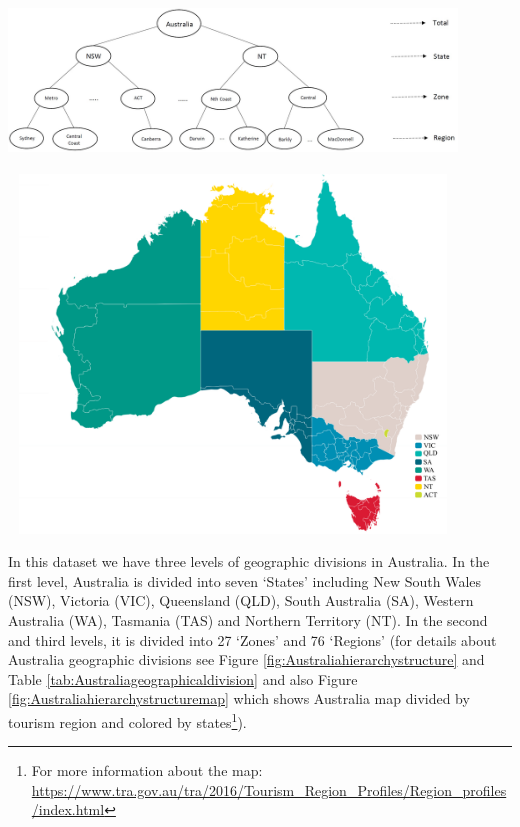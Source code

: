 \documentclass[11pt,a4paper,]{article}
\let\origfigure\figure
\let\endorigfigure\endfigure
\renewenvironment{figure}[1][2] {
    \expandafter\origfigure\expandafter[!htbp]
} {
    \endorigfigure
}
\begin{document}
\begin{figure}

{\centering \includegraphics[width=450px,height=150px]{Paper-Figures/Australian_hierarchy_structure} 

}

\caption{Australian geographic hierarchical structure.}\label{fig:Australiahierarchystructure}
\end{figure}

\begin{figure}

{\centering \includegraphics[width=450px,height=360px]{Paper-Figures/ausTurRegions} 

}

\caption{Australia tourism region map - colors represent states.}\label{fig:Australiahierarchystructuremap}
\end{figure}

\newpage

In this dataset we have three levels of geographic divisions in
Australia. In the first level, Australia is divided into seven `States'
including New South Wales (NSW), Victoria (VIC), Queensland (QLD), South
Australia (SA), Western Australia (WA), Tasmania (TAS) and Northern
Territory (NT). In the second and third levels, it is divided into 27
`Zones' and 76 `Regions' (for details about Australia geographic
divisions see Figure \ref{fig:Australiahierarchystructure} and Table
\ref{tab:Australiageographicaldivision} and also Figure
\ref{fig:Australiahierarchystructuremap} which shows Australia map
divided by tourism region and colored by states\footnote{For more
  information about the map:
  \url{https://www.tra.gov.au/tra/2016/Tourism_Region_Profiles/Region_profiles/index.html}}).
\end{document}
